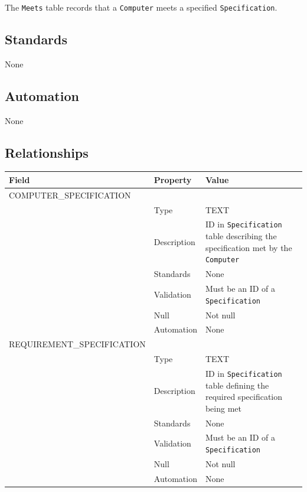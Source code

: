 \documentclass[
]{article}
\newcounter{none}
\begin{document}
The \texttt{Meets} table records that a \texttt{Computer} meets a
specified \texttt{Specification}.

\subsection{Standards}\label{standards-19}

None

\subsection{Automation}\label{automation-19}

None

\subsection{Relationships}\label{relationships-15}

{\def\LTcaptype{none} 
\begin{longtable}[]{@{}
  >{\raggedright\arraybackslash}p{}
  >{\raggedright\arraybackslash}p{}
  >{\raggedright\arraybackslash}p{}@{}}
\toprule\noalign{}
\begin{minipage}[b]{\linewidth}\raggedright
Field
\end{minipage} & \begin{minipage}[b]{\linewidth}\raggedright
Property
\end{minipage} & \begin{minipage}[b]{\linewidth}\raggedright
Value
\end{minipage} \\
\midrule\noalign{}
\endhead
\bottomrule\noalign{}
\endlastfoot
COMPUTER\_SPECIFICATION & & \\
& Type & TEXT \\
& Description & ID in \texttt{Specification} table describing the
specification met by the \texttt{Computer} \\
& Standards & None \\
& Validation & Must be an ID of a \texttt{Specification} \\
& Null & Not null \\
& Automation & None \\
REQUIREMENT\_SPECIFICATION & & \\
& Type & TEXT \\
& Description & ID in \texttt{Specification} table defining the required
specification being met \\
& Standards & None \\
& Validation & Must be an ID of a \texttt{Specification} \\
& Null & Not null \\
& Automation & None \\
\end{longtable}
}
\end{document}
